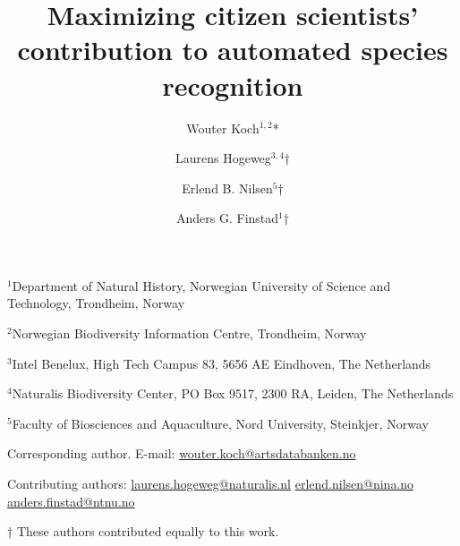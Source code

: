 \documentclass{article}
\begin{document}
\title{Maximizing citizen scientists' contribution to automated species recognition}
\date{}

\author{Wouter Koch\(^{1,2}\)*
\and
Laurens Hogeweg\(^{3,4}\)†
\and
Erlend B. Nilsen\(^{5}\)†
\and
Anders G. Finstad\(^1\)†}

\maketitle

\begin{center}

{\footnotesize \(^1\)Department of Natural History, Norwegian University of Science and Technology, Trondheim, Norway}

{\footnotesize \(^2\)Norwegian Biodiversity Information Centre, Trondheim, Norway}

{\footnotesize \(^3\)Intel Benelux, High Tech Campus 83, 5656 AE Eindhoven, The Netherlands}

{\footnotesize \(^4\)Naturalis Biodiversity Center, PO Box 9517, 2300 RA, Leiden, The Netherlands}

{\footnotesize \(^5\)Faculty of Biosciences and Aquaculture, Nord University, Steinkjer, Norway}




\center\parbox{200pt}{\normalsize\center *Corresponding author.
E-mail:
\href{mailto:wouter.koch@artsdatabanken.no}{wouter.koch@artsdatabanken.no}

Contributing authors:
\href{mailto:laurens.hogeweg@naturalis.nl}{laurens.hogeweg@naturalis.nl}
\href{mailto:erlend.nilsen@nina.no}{erlend.nilsen@nina.no}
\href{mailto:anders.finstad@ntnu.no}{anders.finstad@ntnu.no}}

\vspace{1cm}

\footnotesize{† These authors contributed equally to this work.}

\end{center}

\newpage


\justifying
\normalsize
\end{document}
